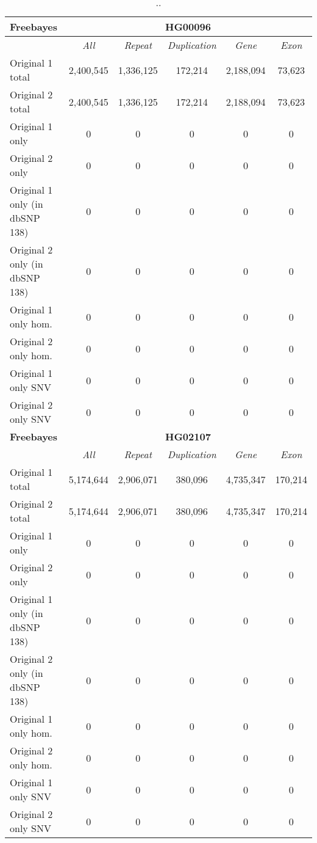 \begin{table}[htb]
\caption{ .. }
\begin{center}
\begin{tabular}{|l|c||c|c|c|c|}
\hline
{\bf Freebayes} & \multicolumn{5}{|c|}{\bf HG00096} \\
\hline
\cline{2-6}
{\bf} & {\it All} & {\it Repeat} & {\it Duplication} & {\it Gene} & {\it Exon} \\
\hline
Original 1 total & 2,400,545 & 1,336,125 & 172,214 & 2,188,094 & 73,623\\ 
\hline
Original 2 total & 2,400,545 & 1,336,125 & 172,214 & 2,188,094 & 73,623\\ 
\hline
Original 1 only & 0 & 0 & 0 & 0 & 0\\ 
\hline
Original 2 only & 0 & 0 & 0 & 0 & 0\\ 
\hline
Original 1 only (in dbSNP 138) & 0 & 0 & 0 & 0 & 0\\ 
\hline
Original 2 only (in dbSNP 138) & 0 & 0 & 0 & 0 & 0\\ 
\hline
Original 1 only hom. & 0 & 0 & 0 & 0 & 0\\ 
\hline
Original 2 only hom. & 0 & 0 & 0 & 0 & 0\\ 
\hline
Original 1 only SNV & 0 & 0 & 0 & 0 & 0\\ 
\hline
Original 2 only SNV & 0 & 0 & 0 & 0 & 0\\ 
\hline
\hline
{\bf Freebayes} & \multicolumn{5}{|c|}{\bf HG02107} \\
\hline
\cline{2-6}
{\bf} & {\it All} & {\it Repeat} & {\it Duplication} & {\it Gene} & {\it Exon} \\
\hline
Original 1 total & 5,174,644 & 2,906,071 & 380,096 & 4,735,347 & 170,214\\ 
\hline
Original 2 total & 5,174,644 & 2,906,071 & 380,096 & 4,735,347 & 170,214\\ 
\hline
Original 1 only & 0 & 0 & 0 & 0 & 0\\ 
\hline
Original 2 only & 0 & 0 & 0 & 0 & 0\\ 
\hline
Original 1 only (in dbSNP 138) & 0 & 0 & 0 & 0 & 0\\ 
\hline
Original 2 only (in dbSNP 138) & 0 & 0 & 0 & 0 & 0\\ 
\hline
Original 1 only hom. & 0 & 0 & 0 & 0 & 0\\ 
\hline
Original 2 only hom. & 0 & 0 & 0 & 0 & 0\\ 
\hline
Original 1 only SNV & 0 & 0 & 0 & 0 & 0\\ 
\hline
Original 2 only SNV & 0 & 0 & 0 & 0 & 0\\ 
\hline
\end{tabular}
\end{center}
\label{tab:orig-vs-orig2-freebayes}
\end{table}

